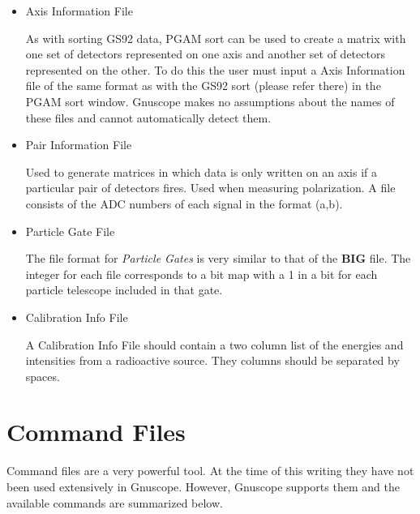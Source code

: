 \begin{itemize}
\item{Axis Information File}

As with sorting GS92 data, PGAM sort can be used to create a matrix with one set of detectors represented on one axis and another set of detectors represented on the other.  To do this the user must input a Axis Information file of the same format as with the GS92 sort (please refer there) in the PGAM sort window.  Gnuscope makes no assumptions about the names of these files and cannot automatically detect them.

\item{Pair Information File}

Used to generate matrices in which data is only written on an axis if a particular pair of detectors fires.  Used when measuring polarization.  A file consists of the ADC numbers of each signal in the format (a,b).

\item{Particle Gate File}

The file format for {\it Particle Gates} is very similar to that of the {\bf BIG} file.  The integer for each file corresponds to a bit map with a 1 in a bit for each particle telescope included in that gate.

\item{Calibration Info File}

A Calibration Info File should contain a two column list of the energies and intensities from a radioactive source.  They columns should be separated by spaces.

\end{itemize}

\section{Command Files}

Command files are a very powerful tool.  At the time of this writing they have not been used extensively in Gnuscope.  However, Gnuscope supports them and the available commands are summarized below.

